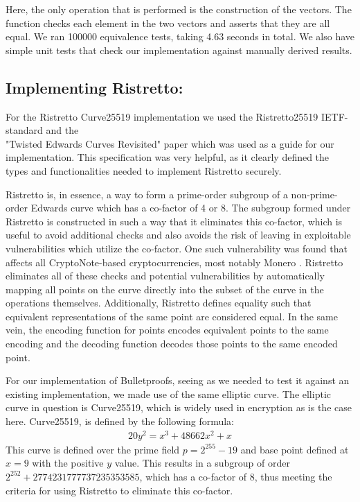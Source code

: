 \documentclass{article}
\newcommand*\ttvar[1]{\texttt{\expandafter\dottvar\detokenize{#1}\relax}}
\newcommand*\dottvar[1]{\ifx\relax#1\else
  \expandafter\ifx\string_#1\string_\allowbreak\else#1\fi
  \expandafter\dottvar\fi}
\newcommand{\eq}[1]{\begin{alignat*}{20}#1\end{alignat*}}
\begin{document}
Here, the only operation that is performed is the construction of the
vectors. The \ttvar{assert_matrices} function checks each element in
the two vectors and asserts that they are all equal. We ran 100000
equivalence tests, taking 4.63 seconds in total. We also have simple
unit tests that check our implementation against manually derived
results.

\subsection{Implementing Ristretto:} \label{implementing-ristretto}

For the Ristretto Curve25519 implementation we used the Ristretto25519
IETF-standard \cite{ristretto-ietf} and the \\
"Twisted Edwards Curves Revisited" paper \cite{edwards-curves} which
was used as a guide for our implementation. This specification was
very helpful, as it clearly defined the types and functionalities
needed to implement Ristretto securely.

Ristretto is, in essence, a way to form a prime-order subgroup of a 
non-prime-order Edwards curve which has a co-factor of 4 or 8. The 
subgroup formed under Ristretto is constructed in such a way that it 
eliminates this co-factor, which is useful to avoid additional checks 
and also avoids the risk of leaving in exploitable vulnerabilities 
which utilize the co-factor. One such vulnerability was found that 
affects all CryptoNote-based cryptocurrencies, most notably Monero 
\cite{cryptonote}. Ristretto eliminates all of these checks and  
potential vulnerabilities by automatically mapping all points on the 
curve directly into the subset of the curve in the operations 
themselves. Additionally, Ristretto defines equality such that equivalent 
representations of the same point are considered equal. In the same 
vein, the encoding function for points encodes equivalent points to the 
same encoding and the decoding function decodes those points to the
same encoded point.

For our implementation of Bulletproofs, seeing as we needed to test it
against an existing implementation, we made use of the same elliptic
curve. The elliptic curve in question is Curve25519, which is widely
used in encryption as is the case here. Curve25519, is defined by the
following formula:
\eq{
	y^2 = x^3 + 48662x^2 + x
}
This curve is defined over the prime field $p = 2^{255} - 19$ and base
point defined at $x = 9$ with the positive $y$ value. This results
in a subgroup of order $2^{252} + 2774231777737235353585$, which has
a co-factor of $8$, thus meeting the criteria for using Ristretto to
eliminate this co-factor.
\end{document}
